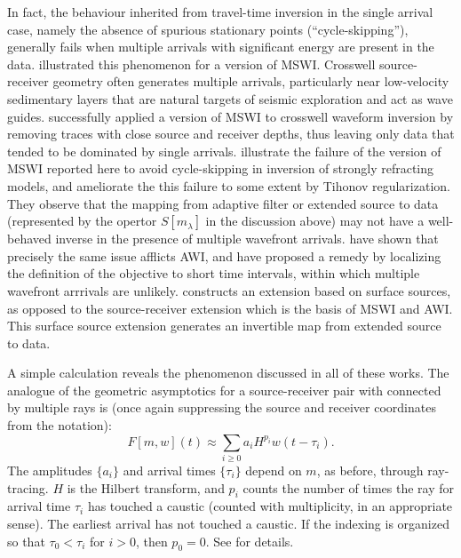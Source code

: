 In fact, the behaviour inherited from travel-time inversion in the
single arrival case, namely the absence of spurious stationary points
(``cycle-skipping''), generally fails when multiple arrivals with
significant energy are present in the data. \cite{Symes:94c}
illustrated this phenomenon for a version of MSWI. Crosswell
source-receiver geometry often generates multiple arrivals,
particularly near low-velocity sedimentary layers that are natural
targets of seismic exploration and act as wave
guides. \cite{Plessix:00} successfully applied a version of MSWI to
crosswell waveform inversion by removing traces with close source and
receiver depths, thus leaving only data that tended to be dominated by
single arrivals. \cite{HuangSymes:Geo17} illustrate the failure of the
version of MSWI reported here to avoid cycle-skipping in inversion of
strongly refracting models, and ameliorate the this failure to some
extent by Tihonov regularization. They observe that the mapping from
adaptive filter or extended source to data (represented by the opertor
$S[m_{\lambda}]$ in the discussion above) may not have a well-behaved inverse in
the presence of multiple wavefront arrivals. \cite{Yongetal:GJI23}
have shown that precisely the same issue afflicts AWI, and have
proposed a remedy by localizing the definition of the objective to
short time intervals, within which multiple wavefront arrrivals are
unlikely. \cite{Symes:23} constructs an extension based on surface
sources, as opposed to the source-receiver extension which is the
basis of MSWI and AWI. This surface source extension generates an
invertible map from extended source to data.

A simple calculation reveals the phenomenon discussed in all of these
works. The analogue of the geometric asymptotics for a source-receiver
pair with connected by multiple rays is (once again suppressing the
source and receiver coordinates from the notation):
\begin{equation}
  \label{eqn:multi}
  F[m,w](t) \approx \sum_{i \ge 0} a_i H^{p_i}w(t-\tau_i).
\end{equation}
The amplitudes $\{a_i\}$ and arrival times $\{\tau_i\}$ depend on $m$, as
before, through ray-tracing. $H$ is the Hilbert transform, and $p_i$
counts the number of times the ray for arrival time $\tau_i$ has
touched a caustic (counted with multiplicity, in an appropriate
sense). The earliest arrival has not touched a caustic. If the
indexing is organized so that $\tau_0 < \tau_i$ for $i>0$, then
$p_0=0$. See \cite{Friedlander:75} for details.

